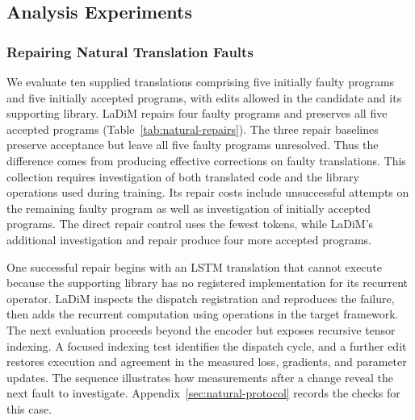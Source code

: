 \subsection{Analysis Experiments}
\label{sec:fault-characterization}

\subsubsection{Repairing Natural Translation Faults}

We evaluate ten supplied translations comprising five initially faulty programs and five initially accepted programs, with edits allowed in the candidate and its supporting library. LaDiM repairs four faulty programs and preserves all five accepted programs (Table~\ref{tab:natural-repairs}). The three repair baselines preserve acceptance but leave all five faulty programs unresolved. Thus the difference comes from producing effective corrections on faulty translations. This collection requires investigation of both translated code and the library operations used during training. Its repair costs include unsuccessful attempts on the remaining faulty program as well as investigation of initially accepted programs. The direct repair control uses the fewest tokens, while LaDiM's additional investigation and repair produce four more accepted programs.

One successful repair begins with an LSTM translation that cannot execute because the supporting library has no registered implementation for its recurrent operator. LaDiM inspects the dispatch registration and reproduces the failure, then adds the recurrent computation using operations in the target framework. The next evaluation proceeds beyond the encoder but exposes recursive tensor indexing. A focused indexing test identifies the dispatch cycle, and a further edit restores execution and agreement in the measured loss, gradients, and parameter updates. The sequence illustrates how measurements after a change reveal the next fault to investigate. Appendix~\ref{sec:natural-protocol} records the checks for this case.

\begin{table}[!htb]
\caption{Repair of natural translation faults and preservation of initially accepted programs. Tokens cover all ten selected complete repair runs, starting from supplied translations.}
\label{tab:natural-repairs}
\centering
\small
\setlength{\tabcolsep}{4pt}

\end{table}

